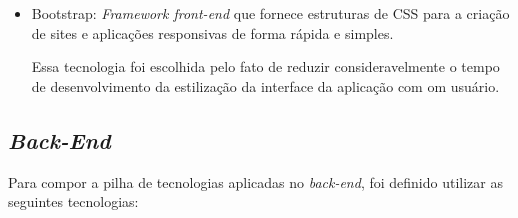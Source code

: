 \documentclass[
    12pt,               %
    openright,          %
    oneside,
    a4paper,            %
    BIBLATEX,           %
    TODO,               %
    english,            %
    brazil              %
    ]{ifsp-spo-inf-ctds}
\begin{document}
\begin{itemize}
            \item Bootstrap:
                \emph{Framework front-end} que fornece estruturas de CSS para a criação de sites e aplicações responsivas de forma rápida e simples.

                Essa tecnologia foi escolhida pelo fato de reduzir consideravelmente o tempo de desenvolvimento da estilização da interface da aplicação com om usuário.

        \end{itemize}  

        \subsection{\emph{Back-End}}

            Para compor a pilha de tecnologias aplicadas no \emph{back-end}, foi definido utilizar as seguintes tecnologias:
\end{document}
